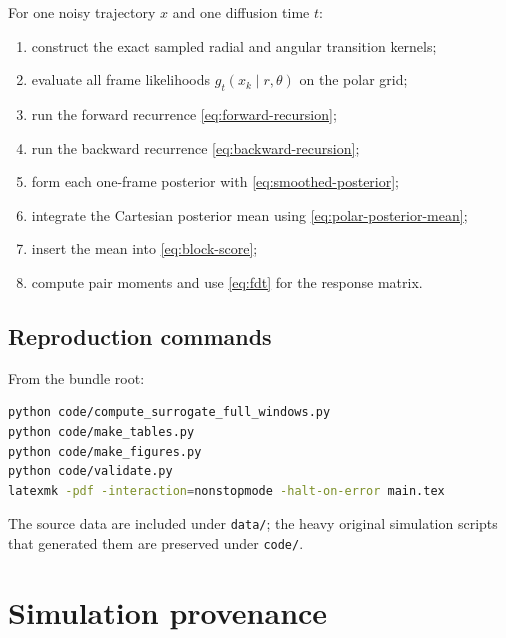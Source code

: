 \documentclass[11pt,a4paper]{article}
\begin{document}
For one noisy trajectory $x$ and one diffusion time $t$:
\begin{enumerate}
\item construct the exact sampled radial and angular transition kernels;
\item evaluate all frame likelihoods $g_t(x_k\mid r,\theta)$ on the polar grid;
\item run the forward recurrence \cref{eq:forward-recursion};
\item run the backward recurrence \cref{eq:backward-recursion};
\item form each one-frame posterior with \cref{eq:smoothed-posterior};
\item integrate the Cartesian posterior mean using \cref{eq:polar-posterior-mean};
\item insert the mean into \cref{eq:block-score};
\item compute pair moments and use \cref{eq:fdt} for the response matrix.
\end{enumerate}

\subsection{Reproduction commands}

From the bundle root:
\begin{lstlisting}[language=bash]
python code/compute_surrogate_full_windows.py
python code/make_tables.py
python code/make_figures.py
python code/validate.py
latexmk -pdf -interaction=nonstopmode -halt-on-error main.tex
\end{lstlisting}
The source data are included under \texttt{data/}; the heavy original simulation scripts that generated them are preserved under \texttt{code/}.

\section{Simulation provenance}
\end{document}
